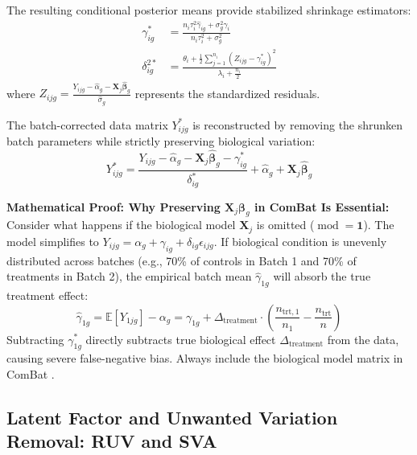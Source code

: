 \documentclass[11pt,oneside]{book}
\begin{document}
The resulting conditional posterior means provide stabilized shrinkage estimators:
\begin{align}
\gamma_{ig}^* &= \frac{n_i \tau_i^2 \hat{\gamma}_{ig} + \sigma_g^2 \gamma_i}{n_i \tau_i^2 + \sigma_g^2} \label{eq:combat_gamma_shrink} \\
\delta_{ig}^{2*} &= \frac{\theta_i + \frac{1}{2}\sum_{j=1}^{n_i} (Z_{ijg} - \gamma_{ig}^*)^2}{\lambda_i + \frac{n_i}{2}} \label{eq:combat_delta_shrink}
\end{align}
where $Z_{ijg} = \frac{Y_{ijg} - \hat{\alpha}_g - \mathbf{X}_j \hat{\boldsymbol{\beta}}_g}{\hat{\sigma}_g}$ represents the standardized residuals.

The batch-corrected data matrix $Y_{ijg}^*$ is reconstructed by removing the shrunken batch parameters while strictly preserving biological variation:
\begin{equation}
\label{eq:combat_corrected}
Y_{ijg}^* = \frac{Y_{ijg} - \hat{\alpha}_g - \mathbf{X}_j \hat{\boldsymbol{\beta}}_g - \gamma_{ig}^*}{\delta_{ig}^*} + \hat{\alpha}_g + \mathbf{X}_j \hat{\boldsymbol{\beta}}_g
\end{equation}

\begin{deepdive}
\textbf{Mathematical Proof: Why Preserving $\mathbf{X}_j \boldsymbol{\beta}_g$ in ComBat Is Essential:}\\
Consider what happens if the biological model $\mathbf{X}_j$ is omitted ($\operatorname{mod} = \mathbf{1}$). The model simplifies to $Y_{ijg} = \alpha_g + \gamma_{ig} + \delta_{ig} \epsilon_{ijg}$. If biological condition is unevenly distributed across batches (e.g., 70\% of controls in Batch 1 and 70\% of treatments in Batch 2), the empirical batch mean $\hat{\gamma}_{1g}$ will absorb the true treatment effect:
\begin{equation}
\hat{\gamma}_{1g} = \mathbb{E}[Y_{1jg}] - \alpha_g = \gamma_{1g} + \Delta_{\text{treatment}} \cdot \left(\frac{n_{\text{trt},1}}{n_1} - \frac{n_{\text{trt}}}{n}\right)
\end{equation}
Subtracting $\gamma_{1g}^*$ directly subtracts true biological effect $\Delta_{\text{treatment}}$ from the data, causing severe false-negative bias. Always include the biological model matrix in ComBat \cite{johnson2007adjusting, nygaard2016methods}.
\end{deepdive}

\subsection{Latent Factor and Unwanted Variation Removal: RUV and SVA}
\end{document}
